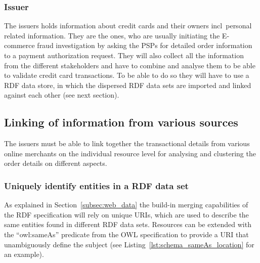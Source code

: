 \subsubsection{Issuer}
\label{subsub:prep_info_issuer}

The issuers holds information about credit cards and their owners \gls{incl}\ personal related information. They are the ones, who are usually initiating the \gls{E-commerce} fraud investigation by asking the \gls{PSP}s for detailed order information to a payment authorization request. They will also collect all the information from the different stakeholders and have to combine and analyse them to be able to validate credit card transactions. To be able to do so they will have to use a \gls{RDF} data store, in which the dispersed \gls{RDF} data sets are imported and linked against each other (see next section).

\subsection{Linking of information from various sources}
\label{subsec:information_mapping}

The issuers must be able to link together the transactional details from various online merchants on the individual resource level for analysing and clustering the order details on different aspects.

\subsubsection{Uniquely identify entities in a \gls{RDF} data set}
\label{subsub:info_unique_id}

As explained in Section~\ref{subsec:web_data} the build-in merging capabilities of the \gls{RDF} specification will rely on unique \gls{URI}s, which are used to describe the same entities found in different \gls{RDF} data sets. Resources can be extended with the ``owl:sameAs'' predicate from the \gls{OWL} specification to provide a \gls{URI} that unambiguously define the subject (see Listing~\ref{lst:schema_sameAs_location} for an example). \@


